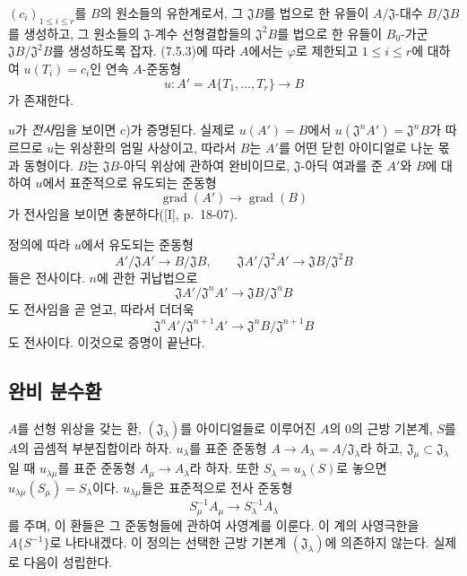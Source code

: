 $(c_i)_{1\leq i\leq r}$를 $B$의 원소들의 유한계로서, 그
$\mathfrak JB$를 법으로 한 유들이 $A/\mathfrak J$-대수
$B/\mathfrak JB$를 생성하고, 그 원소들의 $\mathfrak J$-계수
선형결합들의 $\mathfrak J^2B$를 법으로 한 유들이
$B_0$-가군 $\mathfrak JB/\mathfrak J^2B$를 생성하도록 잡자.
(7.5.3)에 따라 $A$에서는 $\varphi$로 제한되고
$1\leq i\leq r$에 대하여 $u(T_i)=c_i$인 연속 $A$-준동형
\[
  u:A'=A\{T_1,\ldots,T_r\}\longrightarrow B
\]
가 존재한다.

$u$가 \emph{전사}임을 보이면 c)가 증명된다. 실제로
$u(A')=B$에서 $u(\mathfrak J^nA')=\mathfrak J^nB$가 따르므로 $u$는
위상환의 엄밀 사상이고, 따라서 $B$는 $A'$를 어떤 닫힌 아이디얼로
나눈 몫과 동형이다. $B$는 $\mathfrak JB$-아딕 위상에 관하여
완비이므로, $\mathfrak J$-아딕 여과를 준 $A'$와 $B$에 대하여
$u$에서 표준적으로 유도되는 준동형
\[
  \operatorname{grad}(A')\longrightarrow\operatorname{grad}(B)
\]
가 전사임을 보이면 충분하다([I], p.~18-07).

정의에 따라 $u$에서 유도되는 준동형
\[
  A'/\mathfrak JA'\longrightarrow B/\mathfrak JB,
  \qquad
  \mathfrak JA'/\mathfrak J^2A'\longrightarrow
  \mathfrak JB/\mathfrak J^2B
\]
들은 전사이다. $n$에 관한 귀납법으로
\[
  \mathfrak JA'/\mathfrak J^nA'\longrightarrow
  \mathfrak JB/\mathfrak J^nB
\]
도 전사임을 곧 얻고, 따라서 더더욱
\[
  \mathfrak J^nA'/\mathfrak J^{n+1}A'\longrightarrow
  \mathfrak J^nB/\mathfrak J^{n+1}B
\]
도 전사이다. 이것으로 증명이 끝난다.

\subsection{완비 분수환}
\label{subsection:0.7.6-ko}

\begin{env}[7.6.1]
\label{0.7.6.1-ko}
$A$를 선형 위상을 갖는 환, $(\mathfrak J_\lambda)$를 아이디얼들로
이루어진 $A$의 $0$의 근방 기본계, $S$를 $A$의 곱셈적 부분집합이라
하자. $u_\lambda$를 표준 준동형
$A\to A_\lambda=A/\mathfrak J_\lambda$라 하고,
$\mathfrak J_\mu\subset\mathfrak J_\lambda$일 때 $u_{\lambda\mu}$를
표준 준동형 $A_\mu\to A_\lambda$라 하자. 또한
$S_\lambda=u_\lambda(S)$로 놓으면
$u_{\lambda\mu}(S_\mu)=S_\lambda$이다. $u_{\lambda\mu}$들은 표준적으로
전사 준동형
\[
  S_\mu^{-1}A_\mu\longrightarrow S_\lambda^{-1}A_\lambda
\]
를 주며, 이 환들은 그 준동형들에 관하여 사영계를 이룬다. 이 계의
사영극한을 $A\{S^{-1}\}$로 나타내겠다. 이 정의는 선택한 근방
기본계 $(\mathfrak J_\lambda)$에 의존하지 않는다. 실제로 다음이
성립한다.
\end{env}

